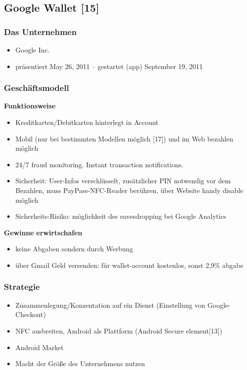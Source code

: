 \subsection{ Google Wallet [15]}
\subsubsection{ Das Unternehmen}
	\begin{itemize}
	\item Google Inc.
	\item präsentiert May 26, 2011 -- gestartet (app) September 19, 2011
	\end{itemize}

\subsubsection{ Geschäftsmodell}
\textbf{Funktionsweise}\\
	\begin{itemize}
	\item Kreditkarten/Debitkarten hinterlegt in Account
	\item Mobil (nur bei bestimmten Modellen möglich [17]) und im Web bezahlen möglich
	\item 24/7 fraud monitoring. Instant transaction notifications. 

	\item Sicherheit: User-Infos verschlüsselt, zusätzlicher PIN notwendig vor dem Bezahlen, muss PayPass-NFC-Reader berühren, über Website handy disable möglich
	\item Sicherheits-Risiko: möglichkeit des eavesdropping bei Google Analytics
	\end{itemize}


\textbf{Gewinne erwirtschafen}\\
	\begin{itemize}
	\item keine Abgaben sondern durch Werbung
	\item über Gmail Geld versenden: für wallet-account kostenlos, sonst 2,9\% abgabe
	\end{itemize}


\subsubsection{ Strategie}
	\begin{itemize}
	\item Zusammenlegung/Konzentation auf ein Dienst (Einstellung von Google-Checkout)
	\item NFC ausbreiten, Android als Plattform (Android Secure element[13])
	\item Android Market
	\item Macht der Größe des Unternehmens nutzen 
	\end{itemize}


